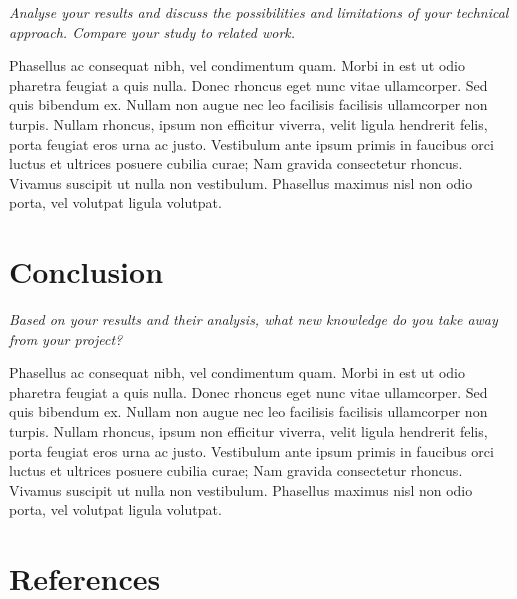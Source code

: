 \documentclass[
]{article}
\begin{document}
\emph{Analyse your results and discuss the possibilities and limitations
of your technical approach. Compare your study to related work.}

Phasellus ac consequat nibh, vel condimentum quam. Morbi in est ut odio
pharetra feugiat a quis nulla. Donec rhoncus eget nunc vitae
ullamcorper. Sed quis bibendum ex. Nullam non augue nec leo facilisis
facilisis ullamcorper non turpis. Nullam rhoncus, ipsum non efficitur
viverra, velit ligula hendrerit felis, porta feugiat eros urna ac justo.
Vestibulum ante ipsum primis in faucibus orci luctus et ultrices posuere
cubilia curae; Nam gravida consectetur rhoncus. Vivamus suscipit ut
nulla non vestibulum. Phasellus maximus nisl non odio porta, vel
volutpat ligula volutpat.

\hypertarget{conclusion}{%
\section{Conclusion}\label{conclusion}}

\emph{Based on your results and their analysis, what new knowledge do
you take away from your project?}

Phasellus ac consequat nibh, vel condimentum quam. Morbi in est ut odio
pharetra feugiat a quis nulla. Donec rhoncus eget nunc vitae
ullamcorper. Sed quis bibendum ex. Nullam non augue nec leo facilisis
facilisis ullamcorper non turpis. Nullam rhoncus, ipsum non efficitur
viverra, velit ligula hendrerit felis, porta feugiat eros urna ac justo.
Vestibulum ante ipsum primis in faucibus orci luctus et ultrices posuere
cubilia curae; Nam gravida consectetur rhoncus. Vivamus suscipit ut
nulla non vestibulum. Phasellus maximus nisl non odio porta, vel
volutpat ligula volutpat.

\hypertarget{references}{%
\section*{References}\label{references}}
\end{document}
